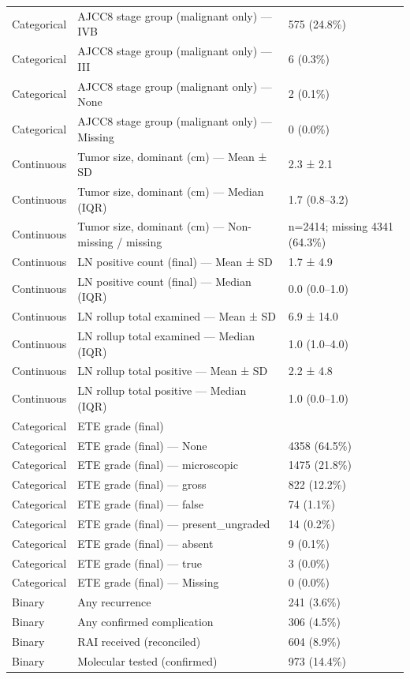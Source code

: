 \begin{table}[htbp]
\begin{tabular}{lll}
Categorical & AJCC8 stage group (malignant only) — IVB & 575 (24.8\%) \\
Categorical & AJCC8 stage group (malignant only) — III & 6 (0.3\%) \\
Categorical & AJCC8 stage group (malignant only) — None & 2 (0.1\%) \\
Categorical & AJCC8 stage group (malignant only) — Missing & 0 (0.0\%) \\
Continuous & Tumor size, dominant (cm) — Mean ± SD & 2.3 ± 2.1 \\
Continuous & Tumor size, dominant (cm) — Median (IQR) & 1.7 (0.8–3.2) \\
Continuous & Tumor size, dominant (cm) — Non-missing / missing & n=2414; missing 4341 (64.3\%) \\
Continuous & LN positive count (final) — Mean ± SD & 1.7 ± 4.9 \\
Continuous & LN positive count (final) — Median (IQR) & 0.0 (0.0–1.0) \\
Continuous & LN rollup total examined — Mean ± SD & 6.9 ± 14.0 \\
Continuous & LN rollup total examined — Median (IQR) & 1.0 (1.0–4.0) \\
Continuous & LN rollup total positive — Mean ± SD & 2.2 ± 4.8 \\
Continuous & LN rollup total positive — Median (IQR) & 1.0 (0.0–1.0) \\
Categorical & ETE grade (final) &  \\
Categorical & ETE grade (final) — None & 4358 (64.5\%) \\
Categorical & ETE grade (final) — microscopic & 1475 (21.8\%) \\
Categorical & ETE grade (final) — gross & 822 (12.2\%) \\
Categorical & ETE grade (final) — false & 74 (1.1\%) \\
Categorical & ETE grade (final) — present\_ungraded & 14 (0.2\%) \\
Categorical & ETE grade (final) — absent & 9 (0.1\%) \\
Categorical & ETE grade (final) — true & 3 (0.0\%) \\
Categorical & ETE grade (final) — Missing & 0 (0.0\%) \\
Binary & Any recurrence & 241 (3.6\%) \\
Binary & Any confirmed complication & 306 (4.5\%) \\
Binary & RAI received (reconciled) & 604 (8.9\%) \\
Binary & Molecular tested (confirmed) & 973 (14.4\%) \\

\end{tabular}
\end{table}
